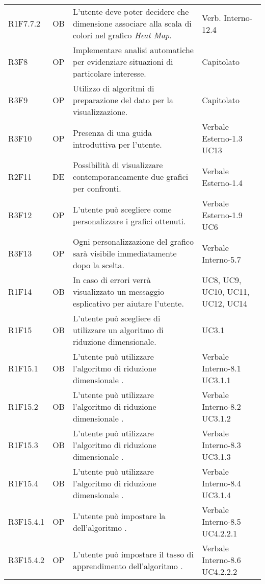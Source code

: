 {\begin{longtable}{C{2cm} | C{1.5cm} | C{9cm} | C{3.3cm}}
R1F7.7.2 & OB & L'utente deve poter decidere che dimensione associare alla scala di colori nel grafico \textit{Heat Map}. & Verb. Interno-12.4\\
R3F8 & OP & Implementare analisi automatiche per evidenziare situazioni di particolare interesse. & Capitolato\\
R3F9 & OP & Utilizzo di algoritmi di preparazione del dato per la visualizzazione. & Capitolato\\
R3F10 & OP & Presenza di una guida introduttiva per l'utente. & Verbale Esterno-1.3 \newline UC13\\
R2F11 & DE & Possibilità di visualizzare contemporaneamente due grafici per confronti. & Verbale Esterno-1.4\\
R3F12 & OP & L'utente può scegliere come personalizzare i grafici ottenuti. & Verbale Esterno-1.9 \newline UC6 \\
R3F13 & OP & Ogni personalizzazione del grafico sarà visibile immediatamente dopo la scelta. & Verbale Interno-5.7 \\
R1F14 & OB & In caso di errori verrà visualizzato un messaggio esplicativo per aiutare l'utente. & UC8, UC9, UC10, UC11, UC12, UC14\\
R1F15 & OB & L'utente può scegliere di utilizzare un algoritmo di riduzione dimensionale. & UC3.1 \\
R1F15.1 & OB & L'utente può utilizzare l'algoritmo di riduzione dimensionale . & Verbale Interno-8.1 \newline UC3.1.1 \\
R1F15.2 & OB & L'utente può utilizzare l'algoritmo di riduzione dimensionale . & Verbale Interno-8.2 \newline UC3.1.2\\
R1F15.3 & OB & L'utente può utilizzare l'algoritmo di riduzione dimensionale . & Verbale Interno-8.3 \newline UC3.1.3\\
R1F15.4 & OB & L'utente può utilizzare l'algoritmo di riduzione dimensionale . & Verbale Interno-8.4 \newline UC3.1.4\\
R3F15.4.1 & OP & L'utente può impostare la  dell'algoritmo . & Verbale Interno-8.5 \newline UC4.2.2.1\\
R3F15.4.2 & OP & L'utente può impostare il tasso di apprendimento dell'algoritmo . & Verbale Interno-8.6 \newline UC4.2.2.2\\

\end{longtable}}
